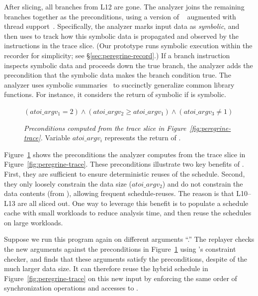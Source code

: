 After slicing, all branches from L12 are gone.  The
analyzer joins the remaining branches together as the
preconditions, using a version of \klee~\cite{klee:osdi08} augmented with
thread support~\cite{cui:tern:osdi10}.  Specifically, the analyzer marks
input data as \emph{symbolic}, and then uses \klee to track how this symbolic
data is propagated and observed by the instructions in the trace slice.
(Our \peregrine prototype runs symbolic execution within the recorder for
simplicity; see \S\ref{sec:peregrine-record}.)
If a branch instruction inspects symbolic data and proceeds down the true
branch, the analyzer adds the precondition that the symbolic data makes
the branch condition true.  The analyzer uses symbolic
summaries~\cite{castro:bouncer} to succinctly generalize common library
functions.  For instance, it considers the return of 
symbolic if  is symbolic.

\begin{figure}[t]
\centering
\begin{minipage}[t]{3.1in}
\begin{scriptsize}
$(atoi\_argv_1 = 2) \wedge (atoi\_argv_2 \geq atoi\_argv_1) \wedge
  (atoi\_argv_3 \neq 1) $
\end{scriptsize}
\end{minipage}
\caption{{\em Preconditions computed from the trace slice in
    Figure~\ref{fig:peregrine-trace}.}  Variable $atoi\_argv_i$ represents the
  return of .} \label{fig:peregrine-precond}
\end{figure}

Figure~\ref{fig:peregrine-precond} shows the preconditions the analyzer computes
from the trace slice in Figure~\ref{fig:peregrine-trace}.
These preconditions illustrate two key benefits of \peregrine.
First, they are sufficient to ensure deterministic reuses of the schedule.
Second, they only loosely constrain the data size ($atoi\_argv_2$) and do
not constrain the data contents (from ), allowing frequent
schedule-reuses.  The reason is that L10--L13 are all sliced out.
One way to leverage this benefit is to populate a
schedule cache with small workloads to reduce analysis time, and then
reuse the schedules on large workloads.

Suppose we run this program again on different arguments ``.''
The replayer checks the new arguments against the preconditions in
Figure~\ref{fig:peregrine-precond} using \klee's constraint checker, and finds that these
arguments satisfy the preconditions, despite of the much larger data size.  
It can therefore reuse the hybrid schedule in Figure~\ref{fig:peregrine-trace}
on this new input by enforcing
the same order of synchronization operations and accesses
to .


